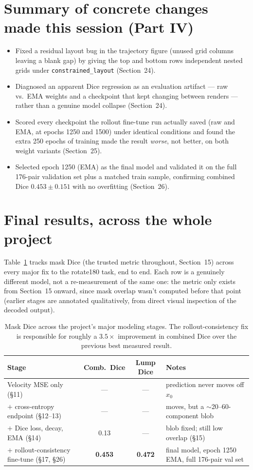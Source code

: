 \documentclass[11pt]{article}
\newcommand{\hsec}[1]{\section*{\color{hdrblue}#1}}
\begin{document}
\hsec{Summary of concrete changes made this session (Part IV)}
\begin{itemize}[nosep]
\item Fixed a residual layout bug in the trajectory figure (unused grid columns leaving a
  blank gap) by giving the top and bottom rows independent nested grids under
  \texttt{constrained\_layout} (Section~24).
\item Diagnosed an apparent Dice regression as an evaluation artifact --- raw vs.\ EMA weights
  and a checkpoint that kept changing between renders --- rather than a genuine model
  collapse (Section~24).
\item Scored every checkpoint the rollout fine-tune run actually saved (raw and EMA, at
  epochs 1250 and 1500) under identical conditions and found the extra 250 epochs of training
  made the result \emph{worse}, not better, on both weight variants (Section~25).
\item Selected epoch 1250 (EMA) as the final model and validated it on the full 176-pair
  validation set plus a matched train sample, confirming combined Dice
  $0.453 \pm 0.151$ with no overfitting (Section~26).
\end{itemize}

\hsec{Final results, across the whole project}
Table~\ref{tab:milestones} tracks mask Dice (the trusted metric throughout, Section~15) across
every major fix to the rotate180 task, end to end. Each row is a genuinely different model,
not a re-measurement of the same one: the metric only exists from Section~15 onward, since
mask overlap wasn't computed before that point (earlier stages are annotated qualitatively,
from direct visual inspection of the decoded output).

\begin{table}[h]
\centering
\small
\begin{tabular}{@{}p{4.6cm}ccp{4.4cm}@{}}
\toprule
Stage & Comb.\ Dice & Lump Dice & Notes \\
\midrule
Velocity MSE only (\S11) & --- & --- & prediction never moves off $x_0$ \\
$+$ cross-entropy endpoint (\S12--13) & --- & --- & moves, but a $\sim$20--60-component blob \\
$+$ Dice loss, decay, EMA (\S14) & 0.13 & --- & blob fixed; still low overlap (\S15) \\
$+$ rollout-consistency fine-tune (\S17, \S26) & \textbf{0.453} & \textbf{0.472} & final model, epoch 1250 EMA, full 176-pair val set \\
\bottomrule
\end{tabular}
\caption{Mask Dice across the project's major modeling stages. The rollout-consistency fix
is responsible for roughly a $3.5\times$ improvement in combined Dice over the previous
best measured result.}
\label{tab:milestones}
\end{table}
\end{document}
